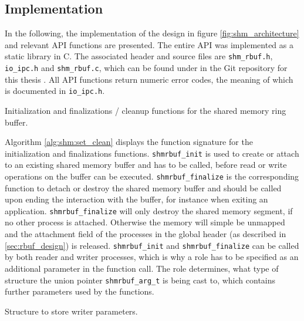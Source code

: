 \subsection{Implementation}
In the following, the implementation of the design in figure \ref{fig:shm_architecture} and relevant API functions are presented.
The entire API was implemented as a static library in C. The associated header and source files are \texttt{shm\_rbuf.h}, \texttt{io\_ipc.h} and \texttt{shm\_rbuf.c}, which can be found 
under  in the Git repository for this thesis \cite{gitlab}. All API functions return numeric error codes, the meaning of which is documented in \texttt{io\_ipc.h}.  
\par
\begin{algorithm}[h!]
    
    \caption[Shared Memory Ringbuffer: Initialization and Cleanup]{Initialization and finalizations / cleanup functions for the shared memory ring buffer.}
    \label{alg:shm:set_clean}
\end{algorithm}
Algorithm \ref{alg:shm:set_clean} displays the function signature for the initialization and finalizations functions.
\texttt{shmrbuf\_init} is used to create or attach to an existing shared memory buffer and has to be called, before read or write operations
on the buffer can be executed. \texttt{shmrbuf\_finalize} is the corresponding function to detach or destroy the shared memory buffer and should be called
upon ending the interaction with the buffer, for instance when exiting an application. \texttt{shmrbuf\_finalize} will only destroy the shared memory segment,
if no other process is attached. Otherwise the memory will simple be unmapped and the attachment field of the processes in the global header (as described in \ref{sec:rbuf_design}) is released. 
\texttt{shmrbuf\_init} and \texttt{shmrbuf\_finalize} can be called by both reader and writer 
processes, which is why a role has to be specified as an additional parameter in the function call. The role determines, what type of structure the union pointer \texttt{shmrbuf\_arg\_t} is being cast to,
which contains further parameters used by the functions. 

\begin{algorithm}[h!]
    
    \caption[Shared Memory Ringbuffer: Writer Parameters]{Structure to store writer parameters.}
    \label{alg:shm:writer_arg}
\end{algorithm}

